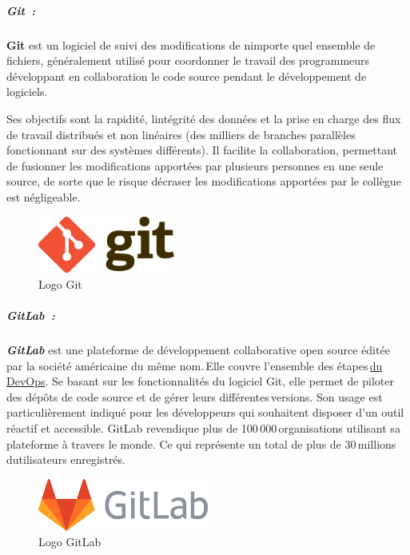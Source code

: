 \documentclass[12pt,a4paper,twoside,openright]{report}
\begin{document}
\hypertarget{git}{%
\subparagraph{Git~:}\label{git}}

\textbf{Git} est un logiciel de suivi des modifications de
n\textquotesingle importe quel ensemble de fichiers, généralement
utilisé pour coordonner le travail des programmeurs développant en
collaboration le code source pendant le développement de logiciels.

Ses objectifs sont la rapidité, l\textquotesingle intégrité des données
et la prise en charge des flux de travail distribués et non linéaires
(des milliers de branches parallèles fonctionnant sur des systèmes
différents). Il facilite la collaboration, permettant de fusionner les
modifications apportées par plusieurs personnes en une seule source, de
sorte que le risque d\textquotesingle écraser les modifications
apportées par le collègue est négligeable.

\begin{figure}[H]
\centering
\includegraphics[width=0.4\textwidth]{latex_media/media/image29.png}
\caption{Logo Git}
\label{fig:logo-git}
\end{figure}

\hypertarget{gitlab}{%
\subparagraph{GitLab~:}\label{gitlab}}

\emph{\textbf{GitLab}} est une plateforme de développement collaborative
open source éditée par la société américaine du même nom.\,Elle couvre
l'ensemble des
étapes\,\href{https://www.journaldunet.fr/web-tech/guide-de-l-entreprise-digitale/1443818-devops-tout-savoir-sur-la-demarche-des-outils-au-metier/}{du
DevOps}. Se basant sur les fonctionnalités du logiciel Git, elle permet
de piloter des dépôts de code source et de gérer leurs
différentes\,versions. Son usage est particulièrement indiqué pour les
développeurs qui souhaitent disposer d'un outil réactif et accessible.
GitLab revendique plus de 100\,000\,organisations utilisant sa
plateforme à travers le monde. Ce qui représente un total de plus de
30\,millions d\textquotesingle utilisateurs enregistrés.

\begin{figure}[H]
\centering
\includegraphics[width=0.5\textwidth]{latex_media/media/image30.png}
\caption{Logo GitLab}
\label{fig:logo-gitlab}
\end{figure}
\end{document}
